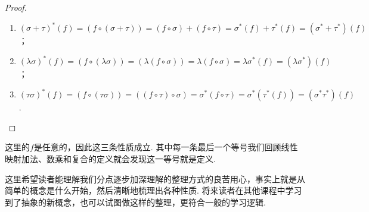 \begin{enumerate}
          \begin{proof}
              \begin{enumerate}
                  \item $(\sigma+\tau)^*(f)=(f\circ(\sigma+\tau))=(f\circ\sigma)+(f\circ\tau)=\sigma^*(f)+\tau^*(f)=(\sigma^*+\tau^*)(f)$；

                  \item $(\lambda\sigma)^*(f)=(f\circ(\lambda\sigma))=(\lambda(f\circ\sigma))=\lambda(f\circ\sigma)=\lambda\sigma^*(f)=(\lambda\sigma^*)(f)$；

                  \item $(\tau\sigma)^*(f)=(f\circ(\tau\sigma))=((f\circ\tau)\circ\sigma)=\sigma^*(f\circ\tau)=\sigma^*(\tau^*(f))=(\sigma^*\tau^*)(f)$.
              \end{enumerate}
          \end{proof}
          这里的$f$是任意的，因此这三条性质成立. 其中每一条最后一个等号我们回顾线性映射加法、数乘和复合的定义就会发现这一等号就是定义.
\end{enumerate}
这里希望读者能理解我们分点逐步加深理解的整理方式的良苦用心，事实上就是从简单的概念是什么开始，然后清晰地梳理出各种性质. 将来读者在其他课程中学习到了抽象的新概念，也可以试图做这样的整理，更符合一般的学习逻辑.

